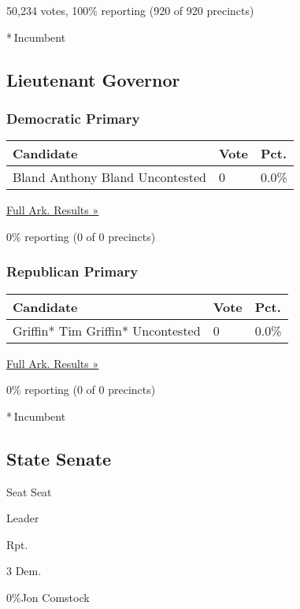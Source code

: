 50,234 votes, 100\% reporting (920 of 920 precincts)

* Incumbent

\hypertarget{lieutenant-governor}{%
\subsection{Lieutenant Governor}\label{lieutenant-governor}}

\hypertarget{democratic-primary-5}{%
\subsubsection{Democratic Primary}\label{democratic-primary-5}}

\begin{longtable}[]{@{}lll@{}}
\toprule
Candidate & Vote & Pct.\tabularnewline
\midrule
\endhead
 Bland Anthony Bland Uncontested & 0 & 0.0\%\tabularnewline
\bottomrule
\end{longtable}

\href{https://www.nytimes3xbfgragh.onion/elections/results/arkansas}{Full
Ark. Results »}

0\% reporting (0 of 0 precincts)

\hypertarget{republican-primary-5}{%
\subsubsection{Republican Primary}\label{republican-primary-5}}

\begin{longtable}[]{@{}lll@{}}
\toprule
Candidate & Vote & Pct.\tabularnewline
\midrule
\endhead
 Griffin* Tim Griffin* Uncontested & 0 & 0.0\%\tabularnewline
\bottomrule
\end{longtable}

\href{https://www.nytimes3xbfgragh.onion/elections/results/arkansas}{Full
Ark. Results »}

0\% reporting (0 of 0 precincts)

* Incumbent

\hypertarget{state-senate}{%
\subsection{State Senate}\label{state-senate}}

Seat Seat

Leader

Rpt.

3 Dem.

 0\%Jon Comstock

